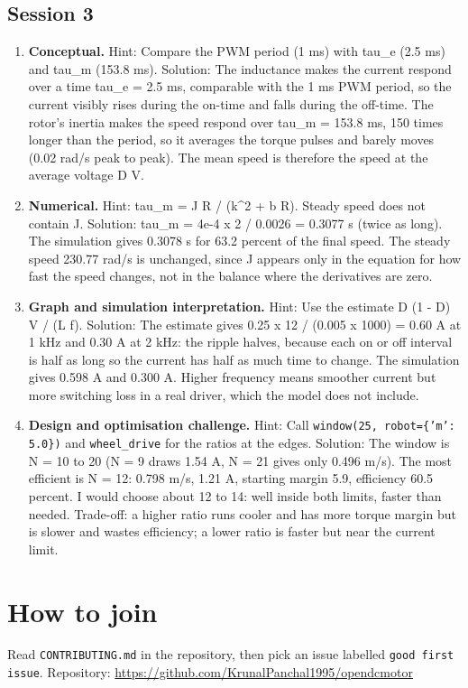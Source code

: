 \documentclass[11pt,a4paper]{article}
\begin{document}
\subsection*{Session 3}
\begin{enumerate}[nosep]
\item \textbf{Conceptual.} Hint: Compare the PWM period (1 ms) with tau\_e (2.5 ms) and tau\_m (153.8 ms). Solution: The inductance makes the current respond over a time tau\_e = 2.5 ms, comparable with the 1 ms PWM period, so the current visibly rises during the on-time and falls during the off-time. The rotor's inertia makes the speed respond over tau\_m = 153.8 ms, 150 times longer than the period, so it averages the torque pulses and barely moves (0.02 rad/s peak to peak). The mean speed is therefore the speed at the average voltage D V.
\item \textbf{Numerical.} Hint: tau\_m = J R / (k\textasciicircum{}2 + b R). Steady speed does not contain J. Solution: tau\_m = 4e-4 x 2 / 0.0026 = 0.3077 s (twice as long). The simulation gives 0.3078 s for 63.2 percent of the final speed. The steady speed 230.77 rad/s is unchanged, since J appears only in the equation for how fast the speed changes, not in the balance where the derivatives are zero.
\item \textbf{Graph and simulation interpretation.} Hint: Use the estimate D (1 - D) V / (L f). Solution: The estimate gives 0.25 x 12 / (0.005 x 1000) = 0.60 A at 1 kHz and 0.30 A at 2 kHz: the ripple halves, because each on or off interval is half as long so the current has half as much time to change. The simulation gives 0.598 A and 0.300 A. Higher frequency means smoother current but more switching loss in a real driver, which the model does not include.
\item \textbf{Design and optimisation challenge.} Hint: Call \texttt{window(25, robot=\{'m': 5.0\})} and \texttt{wheel\_drive} for the ratios at the edges. Solution: The window is N = 10 to 20 (N = 9 draws 1.54 A, N = 21 gives only 0.496 m/s). The most efficient is N = 12: 0.798 m/s, 1.21 A, starting margin 5.9, efficiency 60.5 percent. I would choose about 12 to 14: well inside both limits, faster than needed. Trade-off: a higher ratio runs cooler and has more torque margin but is slower and wastes efficiency; a lower ratio is faster but near the current limit.
\end{enumerate}

\section{How to join}
Read \texttt{CONTRIBUTING.md} in the repository, then pick an issue labelled \texttt{good first issue}. Repository: \url{https://github.com/KrunalPanchal1995/opendcmotor}
\end{document}
